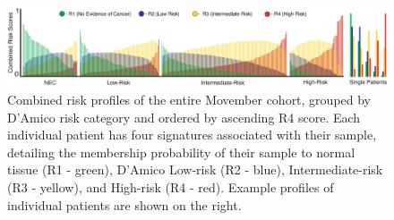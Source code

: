 \documentclass[article,30pt,extrafontsizes]{memoir}
\begin{document}
\begin{mdframed}[style=brentsmdfstyle]
  \endgroup
\end{mdframed}

\graphicspath{ {Figures/} }
\begin{figure}
  \centering
  \includegraphics[width=0.96\linewidth]{RiskProfiles}
  \vspace{-10mm}
  \captionsetup{width=.95\linewidth}
  \caption{Combined risk profiles of the entire Movember cohort, grouped by D’Amico risk category and ordered by ascending R4 score.
  Each individual patient has four signatures associated with their sample, detailing the membership probability of their sample to normal tissue (R1 - green), D’Amico Low-risk (R2 - blue), Intermediate-risk (R3 - yellow), and High-risk (R4 - red). Example profiles of individual patients are shown on the right.}
\end{figure}
\end{document}
